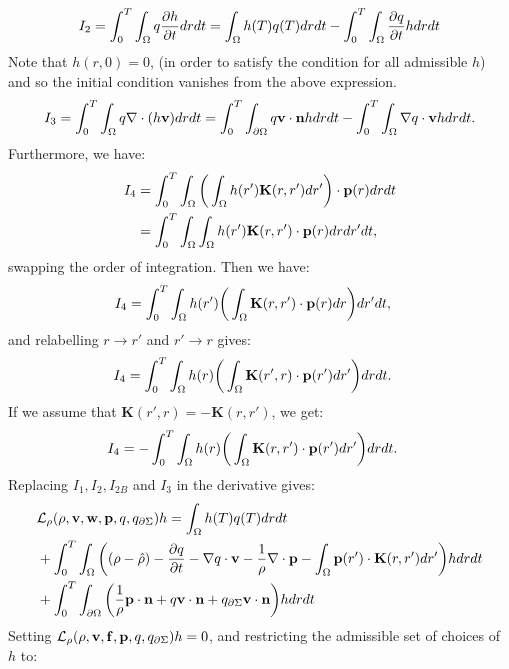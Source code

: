 \begin{align*}
I_2 = \int_0^T \int_\Omega q\frac{\partial h}{\partial t} dr dt = \int_\Omega h(T) q(T) dr dt - \int_0^T \int_\Omega  \frac{\partial q}{\partial t}h dr dt
\end{align*}
Note that ${h}(r,0)=0$, (in order to satisfy the condition for all admissible ${h}$) and so the initial condition vanishes from the above expression.
\begin{align*}
I_3= \int_0^T \int_\Omega q\nabla \cdot (h \mathbf{v}) dr dt = \int_0^T \int_{\partial \Omega} q \mathbf{v} \cdot \mathbf{n} h dr dt - \int_0^T \int_\Omega \nabla q \cdot \mathbf{v} h dr dt.
\end{align*}
Furthermore, we have:
\begin{align*}
I_{4}&= \int_0^T \int_\Omega \bigg(\int_\Omega  h(r') \mathbf{K}(r,r')dr'\bigg) \cdot \mathbf{p}(r) drdt\\
&=\int_0^T \int_\Omega \int_\Omega h(r') \mathbf{K}(r,r') \cdot \mathbf{p}(r) drdr'dt,
\end{align*}
swapping the order of integration. Then we have:
\begin{align*}
I_{4}&= \int_0^T \int_\Omega  h(r')\bigg(\int_\Omega  \mathbf{K}(r,r')\cdot \mathbf{p}(r) dr \bigg)dr'dt,
\end{align*}
and relabelling $r \to r'$ and $r' \to r$ gives:
\begin{align*}
I_{4}&= \int_0^T \int_\Omega  h(r)\bigg(\int_\Omega  \mathbf{K}(r',r) \cdot \mathbf{p}(r') dr' \bigg)drdt.
\end{align*}
If we assume that $\mathbf{K}(r',r) = - \mathbf{K}(r,r')$, we get:
\begin{align*}
I_{4}&= -\int_0^T \int_\Omega  h(r)\bigg(\int_\Omega  \mathbf{K}(r,r') \cdot \mathbf{p}(r') dr' \bigg)drdt.
\end{align*}
Replacing $I_1, I_2, I_{2B}$ and $I_3$ in the derivative gives:
\begin{align*}
&\mathcal{L}_\rho(\rho,\mathbf{v},\mathbf{w},\mathbf{p},q,{q}_{\partial \Sigma})h = \int_\Omega h(T) q(T) dr dt  \\
&+ \int_0^T \int_\Omega \bigg( (\rho - \hat {\rho}) - \frac{\partial q}{\partial t} - \nabla q \cdot \mathbf{v} -\frac{1}{\rho} \nabla\cdot \mathbf{p}  -  \int_\Omega  \mathbf{p}(r') \cdot\mathbf{K}(r,r')   dr'  \bigg)hdr dt\\
&+\int_0^T \int_{\partial \Omega} \bigg(\frac{1}{\rho} \mathbf{p} \cdot \mathbf{n} +  q \mathbf{v} \cdot \mathbf{n}   +{q}_{\partial \Sigma} \mathbf{v} \cdot \mathbf{n}\bigg)h  dr dt
\end{align*}
Setting $\mathcal{L}_\rho(\rho,\mathbf{v},\mathbf{f},\mathbf{p},q,{q}_{\partial \Sigma})h=0$, and restricting the admissible set of choices of $h$ to:

